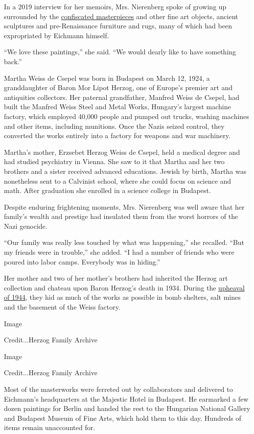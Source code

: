 In a 2019 interview for her memoirs, Mrs. Nierenberg spoke of growing up
surrounded by the
\href{http://hungarylootedart.com/?page_id=32}{confiscated masterpieces}
and other fine art objects, ancient sculptures and pre-Renaissance
furniture and rugs, many of which had been expropriated by Eichmann
himself.

``We love these paintings,'' she said. ``We would dearly like to have
something back.''

Martha Weiss de Csepel was born in Budapest on March 12, 1924, a
granddaughter of Baron Mor Lipot Herzog, one of Europe's premier art and
antiquities collectors. Her paternal grandfather, Manfred Weiss de
Csepel, had built the Manfred Weiss Steel and Metal Works, Hungary's
largest machine factory, which employed 40,000 people and pumped out
trucks, washing machines and other items, including munitions. Once the
Nazis seized control, they converted the works entirely into a factory
for weapons and war machinery.

Martha's mother, Erzsebet Herzog Weiss de Csepel, held a medical degree
and had studied psychiatry in Vienna. She saw to it that Martha and her
two brothers and a sister received advanced educations. Jewish by birth,
Martha was nonetheless sent to a Calvinist school, where she could focus
on science and math. After graduation she enrolled in a science college
in Budapest.

Despite enduring frightening moments, Mrs. Nierenberg was well aware
that her family's wealth and prestige had insulated them from the worst
horrors of the Nazi genocide.

``Our family was really less touched by what was happening,'' she
recalled. ``But my friends were in trouble,'' she added. ``I had a
number of friends who were poured into labor camps. Everybody was in
hiding.''

Her mother and two of her mother's brothers had inherited the Herzog art
collection and chateau upon Baron Herzog's death in 1934. During the
\href{https://memoirs.azrielifoundation.org/articles-and-excerpts/suddenly-the-shadow-fell-the-german-invasion-of-hungary}{upheaval
of 1944}, they hid as much of the works as possible in bomb shelters,
salt mines and the basement of the Weiss factory.

Image

Credit...Herzog Family Archive

Image

Credit...Herzog Family Archive

Most of the masterworks were ferreted out by collaborators and delivered
to Eichmann's headquarters at the Majestic Hotel in Budapest. He
earmarked a few dozen paintings for Berlin and handed the rest to the
Hungarian National Gallery and Budapest Museum of Fine Arts, which hold
them to this day. Hundreds of items remain unaccounted for.


